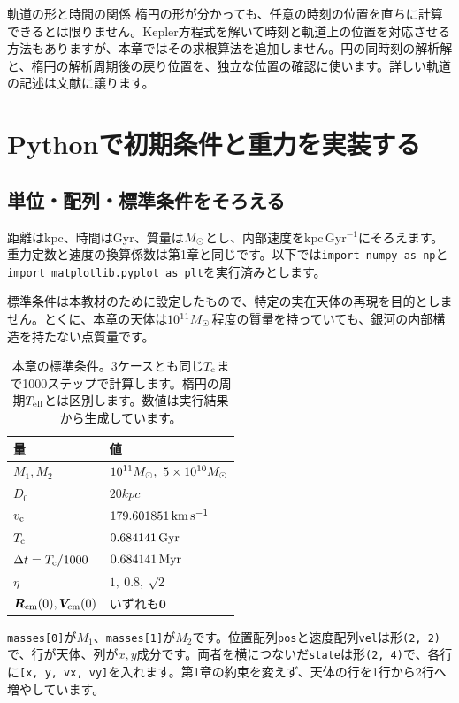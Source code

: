 \begin{notebox}{軌道の形と時間の関係}
楕円の形が分かっても、任意の時刻の位置を直ちに計算できるとは限りません。Kepler方程式を解いて時刻と軌道上の位置を対応させる方法もありますが、本章ではその求根算法を追加しません。円の同時刻の解析解と、楕円の解析周期後の戻り位置を、独立な位置の確認に使います。詳しい軌道の記述は文献\cite{ryden2025}に譲ります。
\end{notebox}

\section{Pythonで初期条件と重力を実装する}
\label{sec:ch2-implementation}
\subsection{単位・配列・標準条件をそろえる}
距離はkpc、時間はGyr、質量は$M_\odot$とし、内部速度を$\mathrm{kpc\,Gyr^{-1}}$にそろえます。重力定数と速度の換算係数は第1章と同じです。以下では\texttt{import numpy as np}と\texttt{import matplotlib.pyplot as plt}を実行済みとします。

標準条件は本教材のために設定したもので、特定の実在天体の再現を目的としません。とくに、本章の天体は$10^{11}M_\odot$程度の質量を持っていても、銀河の内部構造を持たない点質量です。

\begin{table}[htbp]
\centering\small
\caption{本章の標準条件。3ケースとも同じ$T_{\rm c}$まで1000ステップで計算します。楕円の周期$T_{\rm ell}$とは区別します。数値は実行結果から生成しています。}
\label{tab:ch2-parameters}
\begin{tabular}{ll}\toprule
量 & 値\\\midrule
$M_1,M_2$ & $10^{11}\Msun,\ 5\times10^{10}\Msun$\\
$D_0$ & $20\unit{kpc}$\\
$v_{\rm c}$ & $179.601851\,\mathrm{km\,s^{-1}}$\\
$T_{\rm c}$ & $0.684141\,\mathrm{Gyr}$\\
$\Delta t=T_{\rm c}/1000$ & $0.684141\,\mathrm{Myr}$\\
$\eta$ & $1,\ 0.8,\ \sqrt{2}$\\
$\boldsymbol R_{\rm cm}(0),\boldsymbol V_{\rm cm}(0)$ & いずれも$\boldsymbol 0$\\\bottomrule
\end{tabular}
\end{table}

\texttt{masses[0]}が$M_1$、\texttt{masses[1]}が$M_2$です。位置配列\texttt{pos}と速度配列\texttt{vel}は形\texttt{(2, 2)}で、行が天体、列が$x,y$成分です。両者を横につないだ\texttt{state}は形\texttt{(2, 4)}で、各行に\texttt{[x, y, vx, vy]}を入れます。第1章の約束を変えず、天体の行を1行から2行へ増やしています。

